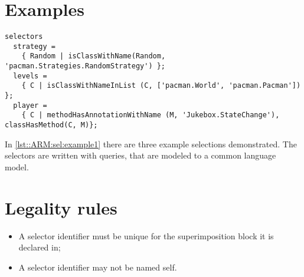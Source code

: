 \section{Examples}
\begin{lstlisting}[caption={Some selector examples}, label = lst::ARM:sel:example1, style=listing, language =ComposeStar, float = tpb]
selectors
  strategy = 
    { Random | isClassWithName(Random, 'pacman.Strategies.RandomStrategy') };
  levels = 
    { C | isClassWithNameInList (C, ['pacman.World', 'pacman.Pacman']) };
  player = 
    { C | methodHasAnnotationWithName (M, 'Jukebox.StateChange'), classHasMethod(C, M)};
\end{lstlisting}
In \autoref{lst::ARM:sel:example1} there are three example selections demonstrated. 
The selectors are written with queries, that are modeled to a common language model.

\section{Legality rules}
\begin{itemize}[noitemsep]
\item A selector identifier must be unique for the superimposition block it is declared in;
\item A selector identifier may not be named self.
\end{itemize}

\comments{ }
